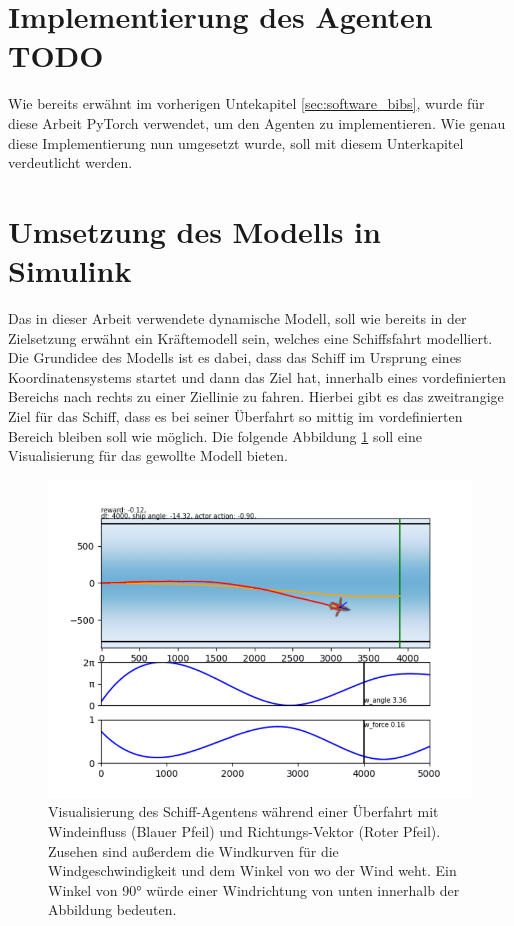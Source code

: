 \documentclass[]{iat}
\begin{document}
\section{Implementierung des Agenten TODO} \label{sec:imp_agent}
Wie bereits erwähnt im vorherigen Untekapitel \ref{sec:software_bibs}, wurde für diese Arbeit PyTorch verwendet, um den Agenten zu implementieren. Wie genau diese Implementierung nun umgesetzt wurde, soll mit diesem Unterkapitel verdeutlicht werden.

\section{Umsetzung des Modells in Simulink} \label{sec:imp_simulink}
Das in dieser Arbeit verwendete dynamische Modell, soll wie bereits in der Zielsetzung erwähnt ein Kräftemodell sein, welches eine Schiffsfahrt modelliert. Die Grundidee des Modells ist es dabei, dass das Schiff im Ursprung eines Koordinatensystems startet und dann das Ziel hat, innerhalb eines vordefinierten Bereichs nach rechts zu einer Ziellinie zu fahren. Hierbei gibt es das zweitrangige Ziel für das Schiff, dass es bei seiner Überfahrt so mittig im vordefinierten Bereich bleiben soll wie möglich. Die folgende Abbildung \ref*{abb:boat_frame_example_2} soll eine Visualisierung für das gewollte Modell bieten.
\begin{figure}[H]
    \includegraphics[width=\textwidth]{graphics/boat_frame_example_2.png}
    \centering
    \caption{Visualisierung des Schiff-Agentens während einer Überfahrt mit Windeinfluss (Blauer Pfeil) und Richtungs-Vektor (Roter Pfeil). Zusehen sind außerdem die Windkurven für die Windgeschwindigkeit und dem Winkel von wo der Wind weht. Ein Winkel von 90° würde einer Windrichtung von unten innerhalb der Abbildung bedeuten.}
    \label{abb:boat_frame_example_2}
\end{figure}
\end{document}
